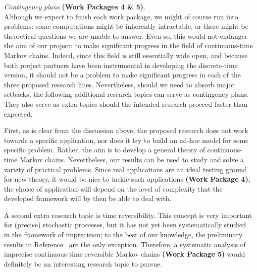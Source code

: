 \documentclass[11pt,dvipsnames,usenames,a4paper]{article}
\begin{document}
\emph{Contingency plans} {\bf (Work Packages 4 \& 5)}.\\[3pt]
Although we expect to finish each work package, we might of course run into problems: some computations might be inherently intractable, or there might be theoretical questions we are unable to answer.
Even so, this would not endanger the aim of our project: to make significant progress in the field of continuous-time Markov chains.
Indeed, since this field is still essentially wide open, and because both project partners have been instrumental in developing the discrete-time version, it should not be a problem to make significant progress in each of the three proposed research lines.
Nevertheless, should we need to absorb major setbacks, the following additional research topics can serve as contingency plans.
They also serve as extra topics should the intended research proceed faster than expected.

First, as is clear from the discussion above, the proposed research does not work towards a specific application, nor does it try to build an ad-hoc model for some specific problem.
Rather, the aim is to develop a general theory of continuous-time Markov chains.
Nevertheless, our results can be used to study and solve a variety of practical problems.
Since real applications are an ideal testing ground for new theory, it would be nice to tackle such applications {\bf (Work Package 4)}; the choice of application will depend on the level of complexity that the developed framework will by then be able to deal with.

A second extra research topic is time reversibility.
This concept is very important for (precise) stochastic processes, but it has not yet been systematically studied in the framework of imprecision; to the best of our knowledge, the preliminary results in Reference~\cite{skulj:16} are the only exception.
Therefore, a systematic analysis of imprecise continuous-time reversible Markov chains {\bf (Work Package 5)} would definitely be an interesting research topic to pursue.
\end{document}
